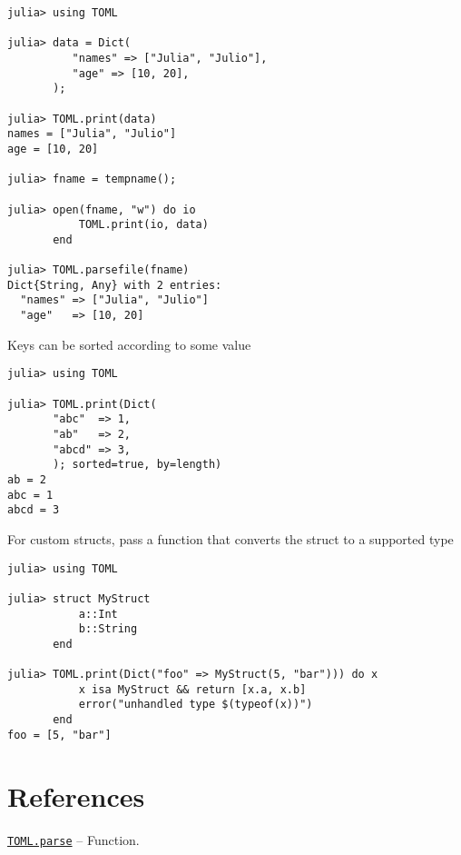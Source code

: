 \begin{verbatim}
julia> using TOML

julia> data = Dict(
          "names" => ["Julia", "Julio"],
          "age" => [10, 20],
       );

julia> TOML.print(data)
names = ["Julia", "Julio"]
age = [10, 20]

julia> fname = tempname();

julia> open(fname, "w") do io
           TOML.print(io, data)
       end

julia> TOML.parsefile(fname)
Dict{String, Any} with 2 entries:
  "names" => ["Julia", "Julio"]
  "age"   => [10, 20]
\end{verbatim}



Keys can be sorted according to some value




\begin{verbatim}
julia> using TOML

julia> TOML.print(Dict(
       "abc"  => 1,
       "ab"   => 2,
       "abcd" => 3,
       ); sorted=true, by=length)
ab = 2
abc = 1
abcd = 3
\end{verbatim}



For custom structs, pass a function that converts the struct to a supported type




\begin{verbatim}
julia> using TOML

julia> struct MyStruct
           a::Int
           b::String
       end

julia> TOML.print(Dict("foo" => MyStruct(5, "bar"))) do x
           x isa MyStruct && return [x.a, x.b]
           error("unhandled type $(typeof(x))")
       end
foo = [5, "bar"]
\end{verbatim}



\hypertarget{13487828328085508990}{}


\section{References}


\hypertarget{12167785999563676987}{}
\hyperlink{12167785999563676987}{\texttt{TOML.parse}}  -- {Function.}


